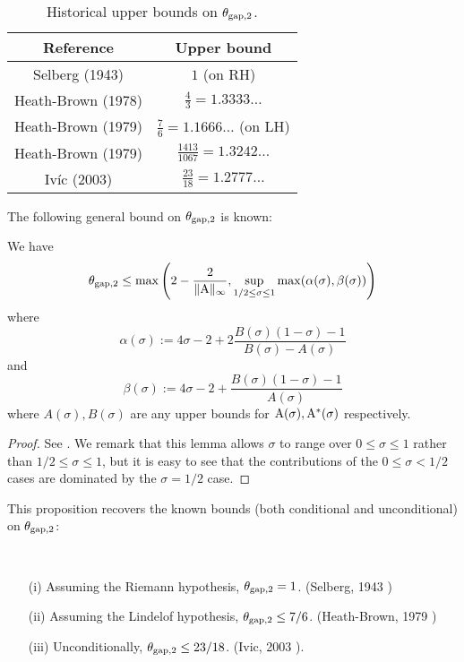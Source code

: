     \begin{table}[ht]
        \caption{Historical upper bounds on $\theta_{\mathrm{gap},2}$.}
        \centering
        \renewcommand{\arraystretch}{1.2}
        \begin{tabular}{|c|c|}
        \hline
        Reference & Upper bound \\
        \hline
        Selberg (1943) \cite{selberg_1943} & $1$ (on RH)\\
        \hline
        Heath-Brown (1978) \cite{heath_brown_consecutive_I} & $\frac{4}{3} = 1.3333\dots$\\
        \hline
        Heath-Brown (1979) \cite{heath_brown_consecutive_II} & $\frac{7}{6} = 1.1666\dots$ (on LH) \\
        \hline
        Heath-Brown (1979) \cite{heath_brown_consecutive_II} & $\frac{1413}{1067} = 1.3242\dots$ \\
        \hline
        Iv\'ic (2003) \cite[Theorem 12.14]{ivic} & $\frac{23}{18} = 1.2777\dots$ \\
        \hline
        \end{tabular}
        \end{table}\label{gapsquare-table}

The following general bound on $\theta_{\mathrm{gap},2}$ is known:

\begin{proposition}\label{gapsquare-from-a}
    We have
    $$ \theta_{\mathrm{gap},2} \leq \max\left( 2-\frac{2}{\|\mathrm{A}\|_\infty}, \sup_{1/2 \leq \sigma \leq 1} \max(\alpha(\sigma), \beta(\sigma))\right)$$
    where
    $$ \alpha(\sigma) := 4\sigma-2 + 2 \frac{B(\sigma)(1-\sigma)-1}{B(\sigma)-A(\sigma)}$$
    and
    $$ \beta(\sigma) := 4\sigma-2 + \frac{B(\sigma)(1-\sigma)-1}{A(\sigma)}$$
    where $A(\sigma), B(\sigma)$ are any upper bounds for $\mathrm{A}(\sigma), \mathrm{A}^*(\sigma)$ respectively.
\end{proposition}

\begin{proof} See \cite[Lemma 2]{heath_brown_consecutive_II}. We remark that this lemma allows $\sigma$ to range over $0 \leq \sigma \leq 1$ rather than $1/2 \leq \sigma \leq 1$, but it is easy to see that the contributions of the $0 \leq \sigma < 1/2$ cases are dominated by the $\sigma=1/2$ case.
\end{proof}

This proposition recovers the known bounds (both conditional and unconditional) on $\theta_{\mathrm{gap},2}$:

\begin{corollary}\
    \begin{itemize}
    \item[(i)] Assuming the Riemann hypothesis, $\theta_{\mathrm{gap},2} = 1$. (Selberg, 1943 \cite{selberg_1943})
    \item[(ii)] Assuming the Lindelof hypothesis, $\theta_{\mathrm{gap},2} \leq 7/6$. (Heath-Brown, 1979 \cite{heath_brown_consecutive_II})
    \item[(iii)] Unconditionally, $\theta_{\mathrm{gap},2} \leq 23/18$. (Ivic, 2003 \cite[Theorem 12.14]{ivic}).
\end{itemize}
\end{corollary}

